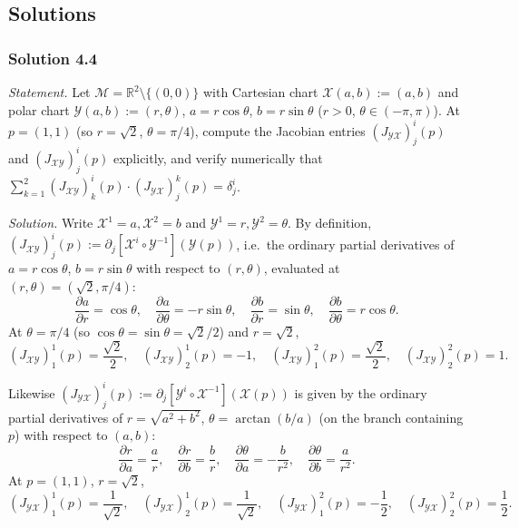 \documentclass[11pt]{article}
\begin{document}
\subsection*{Solutions}

\subsubsection*{Solution 4.4}

\noindent\textit{Statement.} Let $\mathcal M=\mathbb R^2\setminus\{(0,0)\}$
with Cartesian chart $\mathcal X(a,b):=(a,b)$ and polar chart $\mathcal
Y(a,b):=(r,\theta)$, $a=r\cos\theta$, $b=r\sin\theta$ ($r>0$,
$\theta\in(-\pi,\pi)$). At $p=(1,1)$ (so $r=\sqrt2$, $\theta=\pi/4$),
compute the Jacobian entries $(J_{\mathcal{YX}})^i_j(p)$ and
$(J_{\mathcal{XY}})^i_j(p)$ explicitly, and verify numerically that
$\sum_{k=1}^2(J_{\mathcal{XY}})^i_k(p)\cdot(J_{\mathcal{YX}})^k_j(p)=
\delta^i_j$.

\medskip
\noindent\textit{Solution.} Write $\mathcal X^1=a,\mathcal X^2=b$ and
$\mathcal Y^1=r,\mathcal Y^2=\theta$. By definition,
$(J_{\mathcal{XY}})^i_j(p):=\partial_j[\mathcal X^i\circ\mathcal
Y^{-1}](\mathcal Y(p))$, i.e.\ the ordinary partial derivatives of
$a=r\cos\theta$, $b=r\sin\theta$ with respect to $(r,\theta)$, evaluated at
$(r,\theta)=(\sqrt2,\pi/4)$:
\[
\frac{\partial a}{\partial r}=\cos\theta,\quad \frac{\partial
a}{\partial\theta}=-r\sin\theta,\quad \frac{\partial b}{\partial
r}=\sin\theta,\quad \frac{\partial b}{\partial\theta}=r\cos\theta.
\]
At $\theta=\pi/4$ (so $\cos\theta=\sin\theta=\sqrt2/2$) and $r=\sqrt2$,
\[
(J_{\mathcal{XY}})^1_1(p)=\frac{\sqrt2}{2},\quad
(J_{\mathcal{XY}})^1_2(p)=-1,\quad
(J_{\mathcal{XY}})^2_1(p)=\frac{\sqrt2}{2},\quad
(J_{\mathcal{XY}})^2_2(p)=1.
\]

Likewise $(J_{\mathcal{YX}})^i_j(p):=\partial_j[\mathcal Y^i\circ\mathcal
X^{-1}](\mathcal X(p))$ is given by the ordinary partial derivatives of
$r=\sqrt{a^2+b^2}$, $\theta=\arctan(b/a)$ (on the branch containing $p$)
with respect to $(a,b)$:
\[
\frac{\partial r}{\partial a}=\frac{a}{r},\quad \frac{\partial
r}{\partial b}=\frac{b}{r},\quad \frac{\partial\theta}{\partial
a}=-\frac{b}{r^2},\quad \frac{\partial\theta}{\partial b}=\frac{a}{r^2}.
\]
At $p=(1,1)$, $r=\sqrt2$,
\[
(J_{\mathcal{YX}})^1_1(p)=\frac{1}{\sqrt2},\quad
(J_{\mathcal{YX}})^1_2(p)=\frac{1}{\sqrt2},\quad
(J_{\mathcal{YX}})^2_1(p)=-\frac12,\quad
(J_{\mathcal{YX}})^2_2(p)=\frac12.
\]
\end{document}
